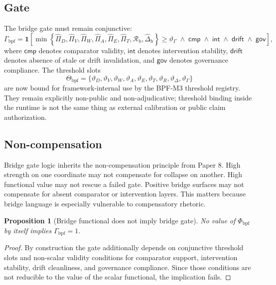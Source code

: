 \documentclass[11pt,a4paper]{article}
\newtheorem{proposition}[theorem]{Proposition}
\theoremstyle{definition}
\newcommand{\PhiBridge}{\Phi_{\mathrm{bpf}}}
\newcommand{\GateBridge}{\Gamma_{\mathrm{bpf}}}
\newcommand{\BridgeMargin}{\mathcal{R}_{\mathrm{b}}}
\newcommand{\Thresholds}{\Theta_{\mathrm{bpf}}}
\begin{document}
\subsection{Gate}
The bridge gate must remain conjunctive:
\[
\GateBridge
=
\mathbf{1}
\left[
\min
\left\{
\widehat{\Pi}_D,
\widehat{\Pi}_V,
\widehat{\Pi}_W,
\widehat{\Pi}_A,
\widehat{\Pi}_E,
\widehat{\Pi}_T,
\BridgeMargin,
\widehat{\Delta}_{\mathrm{b}}
\right\}
\ge
\vartheta_{\Gamma}
\;\land\;
\mathsf{cmp}
\;\land\;
\mathsf{int}
\;\land\;
\mathsf{drift}
\;\land\;
\mathsf{gov}
\right],
\]
where $\mathsf{cmp}$ denotes comparator validity, $\mathsf{int}$ denotes intervention stability, $\mathsf{drift}$ denotes absence of stale or drift invalidation, and $\mathsf{gov}$ denotes governance compliance. The threshold slots
\[
\Thresholds=
\{\vartheta_D,\vartheta_V,\vartheta_W,\vartheta_A,\vartheta_E,\vartheta_T,\vartheta_R,\vartheta_\Delta,\vartheta_{\Gamma}\}
\]
are now bound for framework-internal use by the BPF-M3 threshold registry. They remain explicitly non-public and non-adjudicative; threshold binding inside the runtime is not the same thing as external calibration or public claim authorization.

\subsection{Non-compensation}
Bridge gate logic inherits the non-compensation principle from Paper 8. High strength on one coordinate may not compensate for collapse on another. High functional value may not rescue a failed gate. Positive bridge surfaces may not compensate for absent comparator or intervention layers. This matters because bridge language is especially vulnerable to compensatory rhetoric.

\begin{proposition}[Bridge functional does not imply bridge gate]
No value of $\PhiBridge$ by itself implies $\GateBridge=1$.
\end{proposition}

\begin{proof}
By construction the gate additionally depends on conjunctive threshold slots and non-scalar validity conditions for comparator support, intervention stability, drift cleanliness, and governance compliance. Since those conditions are not reducible to the value of the scalar functional, the implication fails.
\end{proof}
\end{document}
